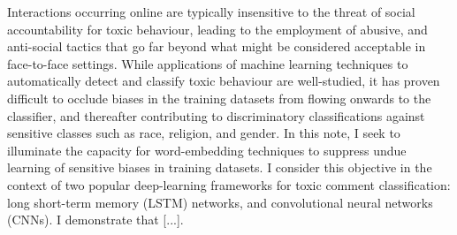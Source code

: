 Interactions occurring online are typically insensitive to the threat of social accountability for toxic behaviour, leading to the employment of abusive, and anti-social tactics that go far beyond what might be considered acceptable in face-to-face settings. While applications of machine learning techniques to automatically detect and classify toxic behaviour are well-studied, it has proven difficult to occlude biases in the training datasets from flowing onwards to the classifier, and thereafter contributing to discriminatory classifications against sensitive classes such as race, religion, and gender. In this note, I seek to illuminate the capacity for word-embedding techniques to suppress undue learning of sensitive biases in training datasets. I consider this objective in the context of two popular deep-learning frameworks for toxic comment classification: long short-term memory (LSTM) networks, and convolutional neural networks (CNNs). I demonstrate that [...].

